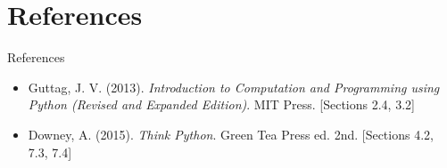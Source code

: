 \documentclass[t,handout,9pt]{beamer}
\begin{document}
\section{References}
\begin{frame}{References}
\begin{itemize}
	\item Guttag, J. V. (2013). \textit{Introduction to Computation and Programming using Python (Revised and Expanded Edition)}. MIT Press. [Sections 2.4, 3.2]
	\item Downey, A. (2015). \textit{Think Python}. Green Tea Press ed. 2nd. [Sections 4.2, 7.3, 7.4]
\end{itemize}
\end{frame}
%

\end{document}
